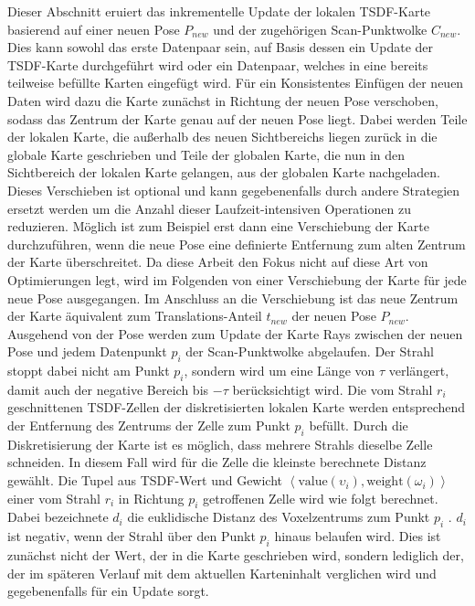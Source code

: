 Dieser Abschnitt eruiert das inkrementelle Update der lokalen TSDF-Karte basierend auf einer neuen Pose $P_{new}$ und der zugehörigen Scan-Punktwolke $C_{new}$. Dies kann sowohl das erste Datenpaar sein, auf Basis dessen ein Update der TSDF-Karte durchgeführt wird oder ein Datenpaar, welches in eine bereits teilweise befüllte Karten eingefügt wird. Für ein Konsistentes Einfügen der neuen Daten wird dazu die Karte zunächst in Richtung der neuen Pose verschoben, sodass das Zentrum der Karte genau auf der neuen Pose liegt. Dabei werden Teile der lokalen Karte, die außerhalb des neuen Sichtbereichs liegen zurück in die globale Karte geschrieben und Teile der globalen Karte, die nun in den Sichtbereich der lokalen Karte gelangen, aus der globalen Karte nachgeladen. Dieses Verschieben ist optional und kann gegebenenfalls durch andere Strategien ersetzt werden um die Anzahl dieser Laufzeit-intensiven Operationen zu reduzieren. Möglich ist zum Beispiel erst dann eine Verschiebung der Karte durchzuführen, wenn die neue Pose eine definierte Entfernung zum alten Zentrum der Karte überschreitet. Da diese Arbeit den Fokus nicht auf diese Art von Optimierungen legt, wird im Folgenden von einer Verschiebung der Karte für jede neue Pose ausgegangen. Im Anschluss an die Verschiebung ist das neue Zentrum der Karte äquivalent zum Translations-Anteil $t_{new}$ der neuen Pose $P_{new}$. Ausgehend von der Pose werden zum Update der Karte Rays zwischen der neuen Pose und jedem Datenpunkt $p_i$ der Scan-Punktwolke abgelaufen. Der Strahl stoppt dabei nicht am Punkt $p_i$, sondern wird um eine Länge von $\tau$ verlängert, damit auch der negative Bereich bis $-\tau$ berücksichtigt wird. Die vom Strahl $r_i$ geschnittenen TSDF-Zellen der diskretisierten lokalen Karte werden entsprechend der Entfernung des Zentrums der Zelle zum Punkt $p_i$ befüllt. Durch die Diskretisierung der Karte ist es möglich, dass mehrere Strahls dieselbe Zelle schneiden. In diesem Fall wird für die Zelle die kleinste berechnete Distanz gewählt. Die Tupel aus TSDF-Wert und Gewicht $\left\langle \text{value} \left(\upsilon_i \right), \text{weight} \left(\omega_i \right) \right\rangle$ einer vom Strahl $r_i$ in Richtung $p_i$ getroffenen Zelle wird wie folgt berechnet. Dabei bezeichnete $d_i$ die euklidische Distanz des Voxelzentrums zum Punkt $p_i$ \cite{HATSDF, Canelhas2017TruncatedSD}. $d_i$ ist negativ, wenn der Strahl über den Punkt $p_i$ hinaus belaufen wird. Dies ist zunächst nicht der Wert, der in die Karte geschrieben wird, sondern lediglich der, der im späteren Verlauf mit dem aktuellen Karteninhalt verglichen wird und gegebenenfalls für ein Update sorgt.


